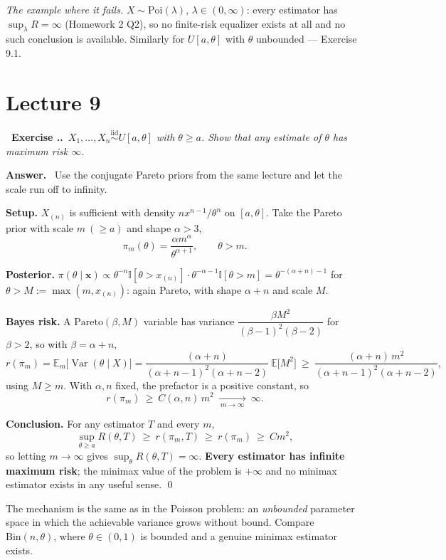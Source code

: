 \documentclass[11pt]{article}
\newcommand{\E}{\mathbb{E}}
\newcommand{\Var}{\operatorname{Var}}
\newcommand{\iid}{\overset{\text{iid}}{\sim}}
\newcommand{\I}{\mathbb{I}}
\newcounter{exc}[section]
\newenvironment{exc}[1]{\medskip\refstepcounter{exc}%
  \noindent\textbf{\color{ForestGreen}\raisebox{0.5pt}{\scriptsize$\blacksquare$}\ Exercise \thesection.\theexc.}\ \textit{#1}\par\nopagebreak}{\par}
\newcommand{\ans}{\smallskip\noindent\textbf{Answer.}\ }
\begin{document}
\emph{The example where it fails.} $X\sim\mathrm{Poi}(\lambda)$, $\lambda\in(0,\infty)$: every
estimator has $\sup_\lambda R=\infty$ (Homework 2 Q2), so no finite-risk equalizer exists at
all and no such conclusion is available. Similarly for $U[a,\theta]$ with $\theta$ unbounded
--- Exercise 9.1.

\section{Lecture 9}

\begin{exc}{$X_1,\dots,X_n\iid U[a,\theta]$ with $\theta\ge a$. Show that any estimate of
$\theta$ has maximum risk $\infty$.}
\end{exc}
\ans
Use the conjugate Pareto priors from the same lecture and let the scale run off to infinity.

\textbf{Setup.} $X_{(n)}$ is sufficient with density $nx^{n-1}/\theta^n$ on $[a,\theta]$.
Take the Pareto prior with scale $m\ (\ge a)$ and shape $\alpha>3$,
\[
\pi_m(\theta)=\frac{\alpha m^{\alpha}}{\theta^{\alpha+1}},\qquad\theta>m .
\]

\textbf{Posterior.} $\pi(\theta\mid\mathbf x)\propto\theta^{-n}\I[\theta>x_{(n)}]\cdot
\theta^{-\alpha-1}\I[\theta>m]=\theta^{-(\alpha+n)-1}$ for
$\theta>M:=\max(m,x_{(n)})$: again Pareto, with shape $\alpha+n$ and scale $M$.

\textbf{Bayes risk.} A $\mathrm{Pareto}(\beta,M)$ variable has variance
$\dfrac{\beta M^{2}}{(\beta-1)^{2}(\beta-2)}$ for $\beta>2$, so with $\beta=\alpha+n$,
\[
r(\pi_m)=\E_m\big[\Var(\theta\mid X)\big]
=\frac{(\alpha+n)}{(\alpha+n-1)^{2}(\alpha+n-2)}\ \E\big[M^{2}\big]
\ \ge\ \frac{(\alpha+n)\,m^{2}}{(\alpha+n-1)^{2}(\alpha+n-2)},
\]
using $M\ge m$. With $\alpha,n$ fixed, the prefactor is a positive constant, so
\[
r(\pi_m)\ \ge\ C(\alpha,n)\,m^{2}\ \xrightarrow[\ m\to\infty\ ]{}\ \infty .
\]

\textbf{Conclusion.} For any estimator $T$ and every $m$,
\[
\sup_{\theta\ge a}R(\theta,T)\ \ge\ r(\pi_m,T)\ \ge\ r(\pi_m)\ \ge\ C m^{2},
\]
so letting $m\to\infty$ gives $\sup_\theta R(\theta,T)=\infty$. \textbf{Every estimator has
infinite maximum risk}; the minimax value of the problem is $+\infty$ and no minimax
estimator exists in any useful sense. \qed

\smallskip
The mechanism is the same as in the Poisson problem: an \emph{unbounded} parameter space in
which the achievable variance grows without bound. Compare $\mathrm{Bin}(n,\theta)$, where
$\theta\in(0,1)$ is bounded and a genuine minimax estimator exists.
\end{document}
